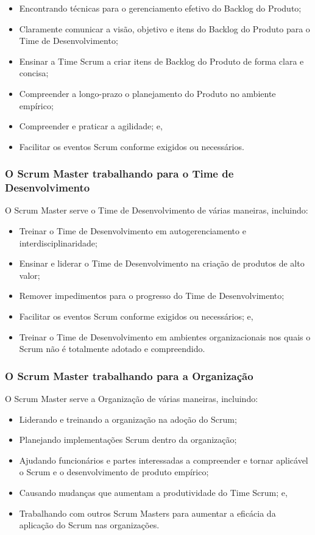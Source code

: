 \begin{itemize}

\item  Encontrando técnicas para o gerenciamento efetivo do Backlog do Produto;
\item Claramente comunicar a visão, objetivo e itens do Backlog do Produto para o Time de
  Desenvolvimento;
\item Ensinar a Time Scrum a criar itens de Backlog do Produto de forma clara e concisa;
\item  Compreender a longo-prazo o planejamento do Produto no ambiente empírico;
\item  Compreender e praticar a agilidade; e,
\item  Facilitar os eventos Scrum conforme exigidos ou necessários.
\end{itemize}



\subsubsection{O Scrum Master trabalhando para o Time de Desenvolvimento}
\label{subs:O Scrum Master trabalhando para o Time de Desenvolvimento}

O Scrum Master serve o Time de Desenvolvimento de várias maneiras, incluindo:

\begin{itemize}
\item  Treinar o Time de Desenvolvimento em autogerenciamento e interdisciplinaridade;
\item  Ensinar e liderar o Time de Desenvolvimento na criação de produtos de alto valor;
\item  Remover impedimentos para o progresso do Time de Desenvolvimento;
\item  Facilitar os eventos Scrum conforme exigidos ou necessários; e,
\item  Treinar o Time de Desenvolvimento em ambientes organizacionais nos quais o Scrum não é
totalmente adotado e compreendido.
\end{itemize}


\subsubsection{O Scrum Master trabalhando para a Organização}
\label{subs:O Scrum Master trabalhando para a Organização}

O Scrum Master serve a Organização de várias maneiras, incluindo:
\begin{itemize}
\item  Liderando e treinando a organização na adoção do Scrum;
\item  Planejando implementações Scrum dentro da organização;
\item  Ajudando funcionários e partes interessadas a compreender e tornar aplicável o Scrum e o
desenvolvimento de produto empírico;
\item  Causando mudanças que aumentam a produtividade do Time Scrum; e,
\item  Trabalhando com outros Scrum Masters para aumentar a eficácia da aplicação do Scrum
nas organizações.
\end{itemize}

